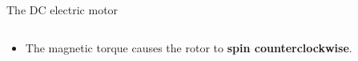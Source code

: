 \begin{frame}{The DC electric motor}
\begin{columns}
\begin{column}{0.50\textwidth}
{\begin{itemize}
\begin{center}
           \end{center}
            \begin{itemize}
                \item on {\color{red}left-hand side}: downwards
                \item on {\color{blue}right-hand side}: upwards
            \end{itemize}
         \item The magnetic torque causes the rotor to {\bf spin counterclockwise}.
      \end{itemize}
    }
  \end{column}
\end{columns}

\end{frame}

%
%
%

